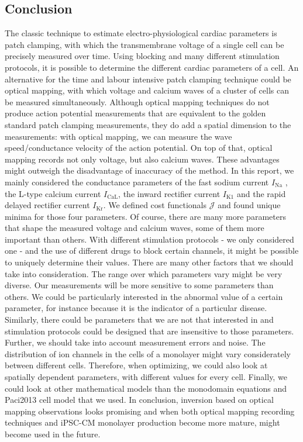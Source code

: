 \documentclass{article}
\begin{document}
\subsection{Conclusion} \label{Conclusion}
The classic technique to estimate electro-physiological cardiac parameters is patch clamping, with which the transmembrane voltage of a single cell can be precisely measured over time. Using blocking and many different stimulation protocols, it is possible to determine the different cardiac parameters of a cell. An alternative for the time and labour intensive patch clamping technique could be optical mapping, with which voltage and calcium waves of a cluster of cells can be measured simultaneously. Although optical mapping techniques do not produce action potential measurements that are equivalent to the golden standard patch clamping measurements, they do add a spatial dimension to the measurements: with optical mapping, we can measure the wave speed/conductance velocity of the action potential. On top of that, optical mapping records not only voltage, but also calcium waves. These advantages might outweigh the disadvantage of inaccuracy of the method. In this report, we mainly considered the conductance parameters of the fast sodium current $I_{\mathrm{Na}}$ , the L-type calcium current $I_{\mathrm{CaL}}$, the inward rectifier current $I_{\mathrm{K1}}$ and the rapid delayed rectifier current $I_{\mathrm{Kr}}$. We defined cost functionals $\mathcal{J}$ and found unique minima for those four parameters. Of course, there are many more parameters that shape the measured voltage and calcium waves, some of them more important than others. With different stimulation protocols - we only considered one - and the use of different drugs to block certain channels, it might be possible to uniquely determine their values. There are many other factors that we should take into consideration. The range over which parameters vary might be very diverse. Our measurements will be more sensitive to some parameters than others. We could be particularly interested in the abnormal value of a certain parameter, for instance because it is the indicator of a particular disease. Similarly, there could be parameters that we are not that interested in and stimulation protocols could be designed that are insensitive to those parameters. Further, we should take into account measurement errors and noise. The distribution of ion channels in the cells of a monolayer might vary considerately between different cells. Therefore, when optimizing, we could also look at spatially dependent parameters, with different values for every cell. Finally, we could look at other mathematical models than the monodomain equations and Paci2013 cell model that we used. In conclusion, inversion based on optical mapping observations looks promising and when both optical mapping recording techniques and iPSC-CM monolayer production become more mature, might become used in the future.


%
\end{document}

